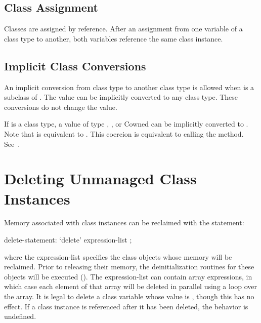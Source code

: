 \subsection{Class Assignment}
\label{Class_Assignment}

Classes are assigned by reference.  After an assignment from one
variable of a class type to another, both variables reference the same
class instance.

\subsection{Implicit Class Conversions}
\label{Implicit_Class_Conversions}

An implicit conversion from class type  to
another class type  is allowed when  is a subclass
of .
The value  can be implicitly converted to any class type.
These conversions do not change the value.

If  is a class type, a value of type ,
, or \chpl C{owned} can be implicitly converted to
. Note that  is equivalent to .
This coercion is equivalent to calling the  method.
See~.

\section{Deleting Unmanaged Class Instances}
\label{Class_Delete}

Memory associated with  class instances can be reclaimed
with the  statement:

\begin{syntax}
delete-statement:
  `delete' expression-list ;
\end{syntax}

where the expression-list specifies the class objects whose memory
will be reclaimed.  Prior to releasing their memory, the
deinitialization routines for these objects will be executed
().  The expression-list can contain array
expressions, in which case each element of that array will be deleted
in parallel using a  loop over the array.  It is legal to
delete a class variable whose value is , though this has no
effect.  If a class instance is referenced after it has been deleted,
the behavior is undefined.

